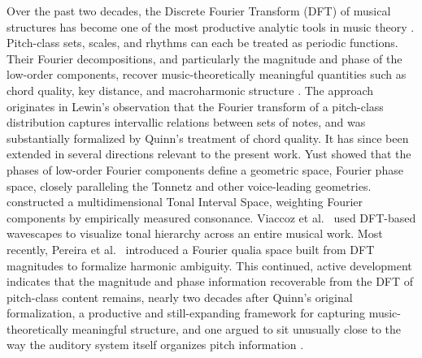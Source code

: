 \documentclass[pdflatex,sn-nature]{sn-jnl}
\begin{document}
Over the past two decades, the Discrete Fourier Transform (DFT) of musical structures has
become one of the most productive analytic tools in music theory \cite{harding2021}.
Pitch-class sets, scales, and rhythms can each be treated as periodic functions. Their
Fourier decompositions, and particularly the magnitude and phase of the low-order
components, recover music-theoretically meaningful quantities such as chord quality, key
distance, and macroharmonic structure \cite{amiot2016}. The approach originates in Lewin's \cite{lewin1959} observation that the Fourier transform of a pitch-class distribution captures intervallic
relations between sets of notes, and was substantially formalized by Quinn's \cite{quinn2007} treatment of chord quality. It has since been extended in several directions relevant to
the present work. Yust \cite{yust2015} showed that the phases of low-order Fourier components
define a geometric space, Fourier phase space, closely paralleling the Tonnetz and other
voice-leading geometries. \cite{bernardes2016} constructed a multidimensional Tonal
Interval Space, weighting Fourier components by empirically measured consonance.
Viaccoz et al.\ \cite{viaccoz2022} used DFT-based wavescapes to visualize tonal hierarchy across an
entire musical work. Most recently, Pereira et al.\ \cite{pereira2025} introduced a Fourier qualia space
built from DFT magnitudes to formalize harmonic ambiguity. This continued, active development indicates that the
magnitude and phase information recoverable from the DFT of pitch-class content remains,
nearly two decades after Quinn's original formalization, a productive and still-expanding
framework for capturing music-theoretically meaningful structure, and one argued to sit
unusually close to the way the auditory system itself organizes pitch information
\cite{amiot2016}.
\end{document}
